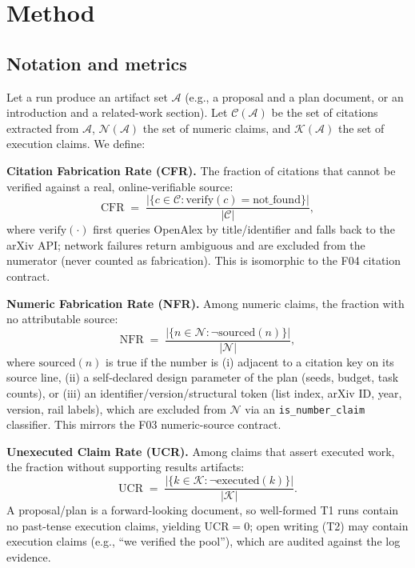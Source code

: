 \documentclass[10pt,twocolumn]{article}
\begin{document}
\section{Method}
\label{sec:method}

\subsection{Notation and metrics}
Let a run produce an artifact set $\mathcal{A}$ (e.g., a proposal and a plan document, or an introduction and a related-work section). Let $\mathcal{C}(\mathcal{A})$ be the set of citations extracted from $\mathcal{A}$, $\mathcal{N}(\mathcal{A})$ the set of numeric claims, and $\mathcal{K}(\mathcal{A})$ the set of execution claims. We define:

\textbf{Citation Fabrication Rate (CFR).} The fraction of citations that cannot be verified against a real, online-verifiable source:
\begin{equation}
\mathrm{CFR} \;=\; \frac{|\{c \in \mathcal{C}: \mathrm{verify}(c) = \mathrm{not\_found}\}|}{|\mathcal{C}|},
\end{equation}
where $\mathrm{verify}(\cdot)$ first queries OpenAlex by title/identifier and falls back to the arXiv API; network failures return $\mathrm{ambiguous}$ and are excluded from the numerator (never counted as fabrication). This is isomorphic to the F04 citation contract.

\textbf{Numeric Fabrication Rate (NFR).} Among numeric claims, the fraction with no attributable source:
\begin{equation}
\mathrm{NFR} \;=\; \frac{|\{n \in \mathcal{N}: \neg \mathrm{sourced}(n)\}|}{|\mathcal{N}|},
\end{equation}
where $\mathrm{sourced}(n)$ is true if the number is (i) adjacent to a citation key on its source line, (ii) a self-declared design parameter of the plan (seeds, budget, task counts), or (iii) an identifier/version/structural token (list index, arXiv ID, year, version, rail labels), which are excluded from $\mathcal{N}$ via an \texttt{is\_number\_claim} classifier. This mirrors the F03 numeric-source contract.

\textbf{Unexecuted Claim Rate (UCR).} Among claims that assert executed work, the fraction without supporting results artifacts:
\begin{equation}
\mathrm{UCR} \;=\; \frac{|\{k \in \mathcal{K}: \neg \mathrm{executed}(k)\}|}{|\mathcal{K}|}.
\end{equation}
A proposal/plan is a forward-looking document, so well-formed T1 runs contain no past-tense execution claims, yielding $\mathrm{UCR}=0$; open writing (T2) may contain execution claims (e.g., ``we verified the pool''), which are audited against the log evidence.
\end{document}
